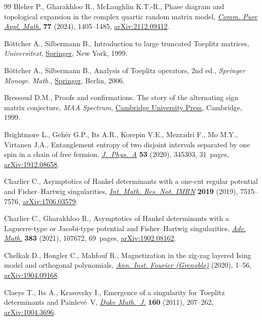 \documentclass[pdftex]{sigma}
\numberwithin{equation}{section}
\begin{document}
\begin{thebibliography}{99}
Bleher P., Gharakhloo R., McLaughlin K.T.-R., Phase diagram and topological
 expansion in the complex quartic random matrix model, \href{https://doi.org/10.1002/cpa.22164}{\textit{Comm. Pure
 Appl. Math.}} \textbf{77} (2024), 1405--1485, \href{https://arxiv.org/abs/2112.09412}{arXiv:2112.09412}.

B\"ottcher A., Silbermann B., Introduction to large truncated {T}oeplitz
 matrices, \textit{Universitext}, \href{https://doi.org/10.1007/978-1-4612-1426-7}{Springer}, New York, 1999.

B\"ottcher A., Silbermann B., Analysis of {T}oeplitz operators, 2nd ed.,
 \textit{Springer Monogr. Math.}, \href{https://doi.org/10.1007/3-540-32436-4}{Springer}, Berlin, 2006.

Bressoud D.M., Proofs and confirmations. The story of the alternating sign
 matrix conjecture, \textit{MAA Spectrum}, \href{https://doi.org/10.1017/CBO9780511613449}{Cambridge University Press}, Cambridge, 1999.

Brightmore L., Geh\'er G.P., Its A.R., Korepin V.E., Mezzadri F., Mo M.Y.,
 Virtanen J.A., Entanglement entropy of two disjoint intervals separated by
 one spin in a chain of free fermion, \href{https://doi.org/10.1088/1751-8121/ab9cf2}{\textit{J.~Phys.~A}} \textbf{53} (2020),
 345303, 31~pages, \href{https://arxiv.org/abs/1912.08658}{arXiv:1912.08658}.

Charlier C., Asymptotics of {H}ankel determinants with a one-cut regular
 potential and {F}isher--{H}artwig singularities, \href{https://doi.org/10.1093/imrn/rny009}{\textit{Int. Math. Res. Not.
 IMRN}} \textbf{2019} (2019), 7515--7576, \href{https://arxiv.org/abs/1706.03579}{arXiv:1706.03579}.

Charlier C., Gharakhloo R., Asymptotics of {H}ankel determinants with a
 {L}aguerre-type or {J}acobi-type potential and {F}isher--{H}artwig
 singularities, \href{https://doi.org/10.1016/j.aim.2021.107672}{\textit{Adv. Math.}} \textbf{383} (2021), 107672, 69~pages,
 \href{https://arxiv.org/abs/1902.08162}{arXiv:1902.08162}.

Chelkak D., Hongler C., Mahfouf R., Magnetization in the zig-zag layered
 {I}sing model and orthogonal polynomials, \href{https://doi.org/10.5802/aif.3605}{\textit{Ann. Inst. Fourier
 (Grenoble)}} (2020), 1--56, \href{https://arxiv.org/abs/1904.09168}{arXiv:1904.09168}.

Claeys T., Its A., Krasovsky I., Emergence of a singularity for {T}oeplitz
 determinants and {P}ainlev\'e~{V}, \href{https://doi.org/10.1215/00127094-1444207}{\textit{Duke Math.~J.}} \textbf{160}
 (2011), 207--262, \href{https://arxiv.org/abs/1004.3696}{arXiv:1004.3696}.


\end{thebibliography}
\end{document}
